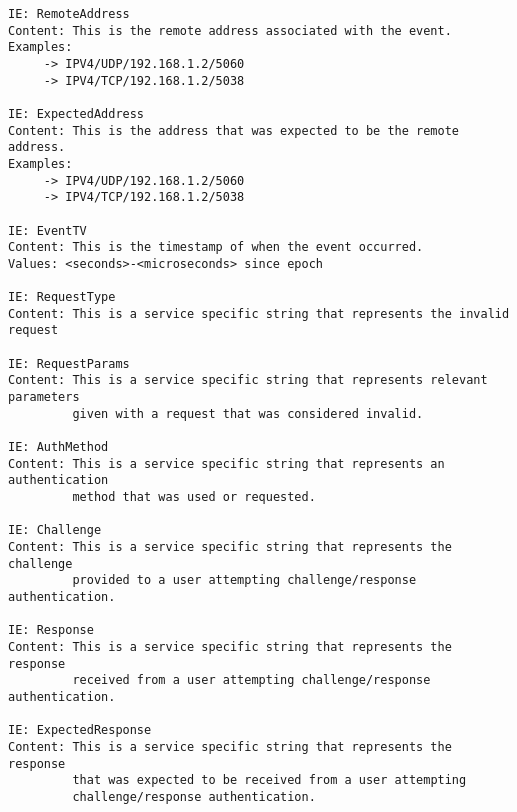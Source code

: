 \begin{verbatim}
IE: RemoteAddress
Content: This is the remote address associated with the event.
Examples:
     -> IPV4/UDP/192.168.1.2/5060
     -> IPV4/TCP/192.168.1.2/5038

IE: ExpectedAddress
Content: This is the address that was expected to be the remote address.
Examples:
     -> IPV4/UDP/192.168.1.2/5060
     -> IPV4/TCP/192.168.1.2/5038

IE: EventTV
Content: This is the timestamp of when the event occurred.
Values: <seconds>-<microseconds> since epoch

IE: RequestType
Content: This is a service specific string that represents the invalid request

IE: RequestParams
Content: This is a service specific string that represents relevant parameters
         given with a request that was considered invalid.

IE: AuthMethod
Content: This is a service specific string that represents an authentication
         method that was used or requested.

IE: Challenge
Content: This is a service specific string that represents the challenge
         provided to a user attempting challenge/response authentication.

IE: Response
Content: This is a service specific string that represents the response
         received from a user attempting challenge/response authentication.

IE: ExpectedResponse
Content: This is a service specific string that represents the response
         that was expected to be received from a user attempting
         challenge/response authentication.

\end{verbatim}

